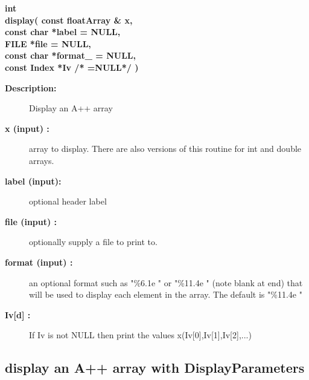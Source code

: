 \begin{flushleft} \textbf{%
int \\ 
\settowidth{\displayIncludeArgIndent}{display(}%
display( const floatArray \& x, \\ 
\hspace{\displayIncludeArgIndent}const char *label    = NULL, \\ 
\hspace{\displayIncludeArgIndent}FILE *file           = NULL, \\ 
\hspace{\displayIncludeArgIndent}const char *format\_  = NULL, \\ 
\hspace{\displayIncludeArgIndent}const Index *Iv /* =NULL*/ )
}\end{flushleft}
\begin{description}
\item[{\bf Description:}] 
    Display an A++ array
\item[{\bf x (input) :}]  array to display. There are also versions of this routine for int and double arrays.
\item[{\bf label (input):}]  optional header label
\item[{\bf file (input) :}]  optionally supply a file to print to.
\item[{\bf format (input) :}]  an optional format such as "\%6.1e " or "\%11.4e " (note blank at end) 
  that will be used to display each element in the array. The default is "\%11.4e "
\item[{\bf Iv[d] :}]  If Iv is not NULL then print the values x(Iv[0],Iv[1],Iv[2],...)
\end{description}
\subsection{display an A++ array with DisplayParameters}
 

